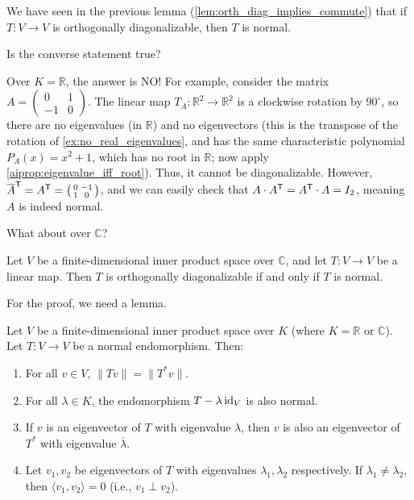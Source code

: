 We have seen in the previous lemma (\cref{lem:orth_diag_implies_commute}) that if $T \colon V \to V$ is orthogonally diagonalizable, then $T$ is normal. 

\begin{question}
Is the converse statement true?
\end{question}

Over $K = \mathbb{R}$, the answer is NO! 
For example, consider the matrix $A = \left(\begin{smallmatrix} 0 & 1 \\ -1 & 0 \end{smallmatrix}\right)$. The linear map $T_A \colon \mathbb{R}^2 \to \mathbb{R}^2$ is a clockwise rotation by $90^\circ$, so there are no eigenvalues (in $\mathbb{R}$) and no eigenvectors (this is the transpose of the rotation of \cref{ex:no_real_eigenvalues}, and has the same characteristic polynomial $P_A(x) = x^2 + 1$, which has no root in $\mathbb{R}$; now apply \cref{aiprop:eigenvalue_iff_root}). Thus, it cannot be diagonalizable.
However, $\overline{A}^{\mathsf{T}} = A^{\mathsf{T}} = \left(\begin{smallmatrix} 0 & -1 \\ 1 & 0 \end{smallmatrix}\right)$, and we can easily check that $A \cdot A^{\mathsf{T}} = A^{\mathsf{T}} \cdot A = I_2$, meaning $A$ is indeed normal.

What about over $\mathbb{C}$?

\begin{theorem}
\label{thm:spectral_thm_c}
Let $V$ be a finite-di\-men\-sional inner product space over $\mathbb{C}$, and let $T \colon V \to V$ be a linear map. Then $T$ is orthogonally diagonalizable if and only if $T$ is normal.
\end{theorem}

For the proof, we need a lemma.

\begin{lemma}
\label{lem:properties_normal_endo}
Let $V$ be a finite-di\-men\-sional inner product space over $K$ (where $K = \mathbb{R}$ or $\mathbb{C}$). Let $T \colon V \to V$ be a normal endomorphism. Then:
\begin{enumerate}[label=\textbf{(\alph*)}]
    \item For all $v \in V$, $\|Tv\| = \|T^*v\|$.
    \item For all $\lambda \in K$, the endomorphism $T - \lambda \operatorname{id}_V$ is also normal.
    \item If $v$ is an eigenvector of $T$ with eigenvalue $\lambda$, then $v$ is also an eigenvector of $T^*$ with eigenvalue $\overline{\lambda}$.
    \item Let $v_1, v_2$ be eigenvectors of $T$ with eigenvalues $\lambda_1, \lambda_2$ respectively. If $\lambda_1 \neq \lambda_2$, then $\langle v_1, v_2 \rangle = 0$ (i.e., $v_1 \perp v_2$).
\end{enumerate}
\end{lemma}

